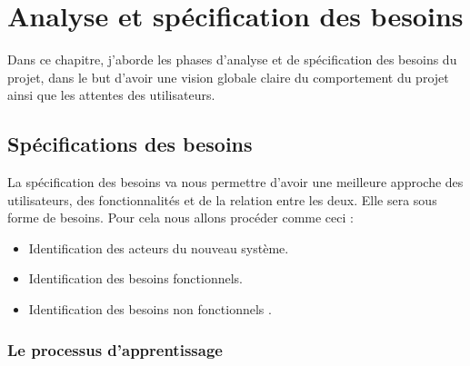 \chapter{Analyse et spécification des besoins}
\label{sec:unchapitre}

\begin{fquote}Dans ce chapitre, j’aborde les phases d’analyse et de spécification des besoins du projet, dans le but d’avoir une vision globale claire du comportement du projet ainsi que les attentes des utilisateurs.
 \end{fquote}

\clearpage

\section{Spécifications des besoins}

La spécification des besoins va nous permettre d’avoir une meilleure approche des utilisateurs, des fonctionnalités et de la relation entre les deux. Elle sera sous forme de besoins. Pour cela nous allons procéder comme ceci :
\begin{itemize}
	\item Identification des acteurs du nouveau système.
	\item Identification des besoins fonctionnels.
	\item Identification des besoins non fonctionnels .
\end{itemize}

\subsection{Le processus d’apprentissage}

